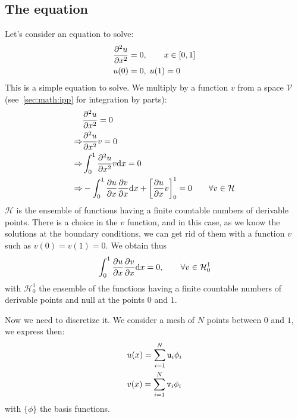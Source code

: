 \subsection{The equation}

Let's consider an equation to solve:
\begin{equation}
\begin{split}
& \frac{\partial^2u}{\partial{x}^2} = 0,\qquad x \in [0,1] \\
& u(0) = 0, \; u(1) = 0
\end{split}
\label{sec:math:eq}
\end{equation}
This is a simple equation to solve.
We multiply by a function $v$ from a space $\mathcal{V}$
(see~\ref{sec:math:ipp} for integration by parts):
\begin{equation}
\begin{split}
            & \frac{\partial^2u}{\partial{x}^2} = 0 \\
\Rightarrow & \frac{\partial^2u}{\partial{x}^2} v = 0 \\
\Rightarrow & \int_0^1\frac{\partial^2u}{\partial{x}^2} v \mathrm{d} x = 0 \\
\Rightarrow & -\int_0^1\frac{\partial u}{\partial x}\frac{\partial v}{\partial x} \mathrm{d} x + \left[\frac{\partial u}{\partial x}v\right]_0^1 = 0 \qquad \forall v \in \mathcal{H}\\
\end{split}
\end{equation}
$\mathcal{H}$ is the ensemble of functions having a finite countable numbers of
derivable points.
There is a choice in the $v$ function, and in this case, as we know the solutions
at the boundary conditions, we can get rid of them with a function $v$ such as
$v(0) = v(1) = 0$. We obtain thus
\begin{equation}
\int_0^1\frac{\partial u}{\partial x}\frac{\partial v}{\partial x} \mathrm{d} x = 0, \qquad \forall v \in \mathcal{H}_0^1
\label{sec:math:weak_form}
\end{equation}
with $\mathcal{H}_0^1$ the ensemble of the functions having a finite countable numbers
of derivable points and null at the points $0$ and $1$.

Now we need to discretize it. We consider a mesh of $N$ points between $0$ and $1$, we
express then:
\begin{equation}
\begin{split}
& u(x) = \sum_{i=1}^{N} \mathtt{u}_i \phi_i \\
& v(x) = \sum_{i=1}^{N} \mathtt{v}_i \phi_i
\end{split}
\label{sec:math:discretization}
\end{equation}
with $\{\phi\}$ the basis functions.

